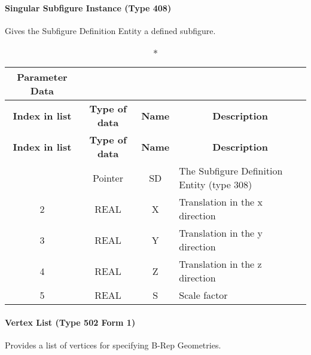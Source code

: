 \paragraph{Singular Subfigure Instance (Type
408)}\label{singular-subfigure-instance-type-408}

Gives the Subfigure Definition Entity a defined subfigure.

\begin{longtable}[H]{|c|c|c|l|}
  \caption*{Parameter Data} \\

  \hline
  \multicolumn{1}{|c|}{\textbf{Index in list}} & \multicolumn{1}{|c|}{\textbf{Type of data}} &
  \multicolumn{1}{|c|}{\textbf{Name}} & \multicolumn{1}{|c|}{\textbf{Description}} \\ \hline
  \endfirsthead
  \hline
  
  \multicolumn{1}{|c|}{\textbf{Index in list}} & \multicolumn{1}{|c|}{\textbf{Type of data}} &
  \multicolumn{1}{|c|}{\textbf{Name}} & \multicolumn{1}{|c|}{\textbf{Description}} \\ \hline
  \endhead
  
  \endfoot

  \endlastfoot
1 & Pointer & SD & The Subfigure Definition Entity (type
308)\\ \hline
2 & REAL & X & Translation in the x direction\\ \hline
3 & REAL & Y & Translation in the y direction\\ \hline
4 & REAL & Z & Translation in the z direction\\ \hline
5 & REAL & S & Scale factor\\ \hline
\end{longtable}

\paragraph{Vertex List (Type 502 Form
1)}\label{vertex-list-type-502-form-1}

Provides a list of vertices for specifying B-Rep Geometries.

